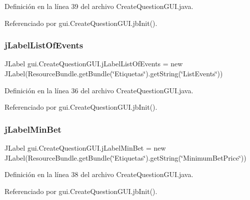 Definición en la línea 39 del archivo Create\+Question\+G\+U\+I.\+java.



Referenciado por gui.\+Create\+Question\+G\+U\+I.\+jb\+Init().

\mbox{\label{classgui_1_1CreateQuestionGUI_a891ee3134074a77ab089c9b654172fb8}} 
\subsubsection{\texorpdfstring{jLabelListOfEvents}{jLabelListOfEvents}}
{\footnotesize\ttfamily J\+Label gui.\+Create\+Question\+G\+U\+I.\+j\+Label\+List\+Of\+Events = new J\+Label(Resource\+Bundle.\+get\+Bundle(\char`\"{}Etiquetas\char`\"{}).get\+String(\char`\"{}List\+Events\char`\"{}))\hspace{0.3cm}{\ttfamily [private]}}



Definición en la línea 36 del archivo Create\+Question\+G\+U\+I.\+java.



Referenciado por gui.\+Create\+Question\+G\+U\+I.\+jb\+Init().

\mbox{\label{classgui_1_1CreateQuestionGUI_a3c355b3f8563c1babcedb4be1f365ee6}} 
\subsubsection{\texorpdfstring{jLabelMinBet}{jLabelMinBet}}
{\footnotesize\ttfamily J\+Label gui.\+Create\+Question\+G\+U\+I.\+j\+Label\+Min\+Bet = new J\+Label(Resource\+Bundle.\+get\+Bundle(\char`\"{}Etiquetas\char`\"{}).get\+String(\char`\"{}Minimum\+Bet\+Price\char`\"{}))\hspace{0.3cm}{\ttfamily [private]}}



Definición en la línea 38 del archivo Create\+Question\+G\+U\+I.\+java.



Referenciado por gui.\+Create\+Question\+G\+U\+I.\+jb\+Init().


